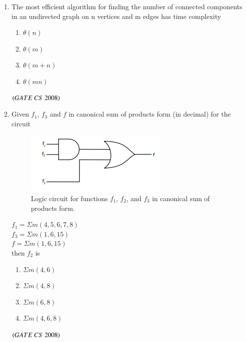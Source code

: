 \documentclass[journal, onecolumn]{IEEEtran}
\numberwithin{equation}{enumi}
\numberwithin{figure}{enumi}
\begin{document}
\begin{enumerate}
\item The most efficient algorithm for finding the number of connected components in an undirected graph on n vertices and m edges has time complexity 
 \vspace{-0.5em}%
\begin{multicols}{4}
\begin{enumerate}
    \item $\theta(n)$ 
    \item $\theta(m)$
    \item $\theta(m+n)$
    \item $\theta(mn)$
\end{enumerate}
\end{multicols}
\hfill $\left(GATE\ CS\  2008\right)$

\item Given $f_1$, $f_3$ and $f$ in canonical sum of products form (in decimal) for the circuit 
\begin{figure}[H]
    \centering
    \includegraphics[width=0.5\columnwidth]{figs/fig2.png}
    \caption{Logic circuit for functions $f_1$, $f_2$, and $f_3$ in canonical sum of products form.}
    \label{fig:2}
   \end{figure}
     $f_1 = \Sigma m(4,5,6,7,8)$\\
     $f_3 = \Sigma m(1,6,15)$\\
     $f= \Sigma m(1,6,15)$\\
     then $f_2$ is
\vspace{-1em}%
\begin{multicols}{4}
\begin{enumerate}
    \item $\Sigma m(4,6)$
    \item $\Sigma m(4,8)$
    \item $\Sigma m(6,8)$
    \item $\Sigma m(4,6,8)$
\end{enumerate}
\end{multicols}
\hfill $\left(GATE\ CS\  2008\right)$


\end{enumerate}
\end{document}
